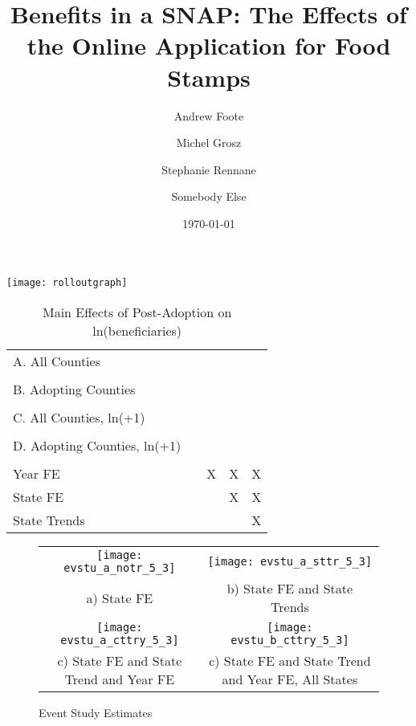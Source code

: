 \documentclass[11pt,letterpaper]{article}
\title{Benefits in a SNAP: The Effects of the Online Application for Food Stamps}
\author[1]{Andrew Foote}
\author[2]{Michel Grosz}
\author[3]{Stephanie Rennane}
\author[4]{Somebody Else}
\affil[1]{Census Bureau}
\affil[2]{Abt Associates}
\affil[3]{RAND Corporation}
\date{\today\\  }
\begin{document}
\maketitle

\texttt{[image: rolloutgraph]}

\begin{table}\caption{Main Effects of Post-Adoption on ln(beneficiaries)}
\def\sym#1{\ifmmode^{#1}\else\(^{#1}\)\fi}
\begin{tabular}{lcccc}\hline\hline
A. All Counties\\\\
B. Adopting Counties\\\\
C. All Counties, ln(+1)\\\\
D. Adopting Counties, ln(+1)\\\\
Year FE&&X&X&X\\
State FE&&&X&X\\
State Trends&&&&X\\
\hline\hline
\end{tabular}
\end{table}



\begin{figure}\caption{Event Study Estimates}
\begin{tabular}{cc}
\texttt{[image: evstu\_a\_notr\_5\_3]}&\texttt{[image: evstu\_a\_sttr\_5\_3]}\\
a) State FE&b) State FE and State Trends\\
\texttt{[image: evstu\_a\_cttry\_5\_3]}&\texttt{[image: evstu\_b\_cttry\_5\_3]}\\
c) State FE and State Trend and  Year FE&c) State FE and State Trend and  Year FE, All States\\
\end{tabular}
\end{figure}
\end{document}
